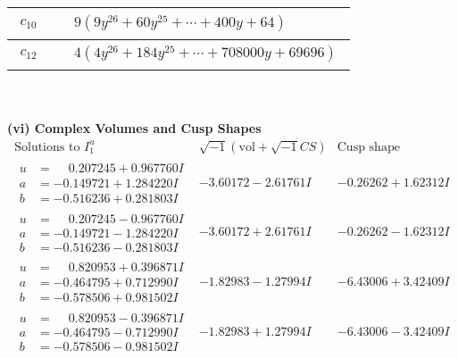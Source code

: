 \documentclass[1p]{elsarticle_modified}
\theoremstyle{definition}
\newcommand{\I}{\sqrt{-1}}
\begin{document}
\begin{tabular}{m{50pt}|m{274pt}}
\hline $$\begin{aligned}c_{10}\end{aligned}$$&$\begin{aligned}
&9(9 y^{26}+60 y^{25}+\cdots+400 y+64)
\end{aligned}$\\
\hline $$\begin{aligned}c_{12}\end{aligned}$$&$\begin{aligned}
&4(4 y^{26}+184 y^{25}+\cdots+708000 y+69696)
\end{aligned}$\\
\hline
\end{tabular}\\~\\
\newpage\flushleft \textbf{(vi) Complex Volumes and Cusp Shapes}
$$\begin{array}{c|c|c}  
\text{Solutions to }I^u_{1}& \I (\text{vol} + \sqrt{-1}CS) & \text{Cusp shape}\\
 \hline 
\begin{aligned}
u &= \phantom{-}0.207245 + 0.967760 I \\
a &= -0.149721 + 1.284220 I \\
b &= -0.516236 + 0.281803 I\end{aligned}
 & -3.60172 - 2.61761 I & -0.26262 + 1.62312 I \\ \hline\begin{aligned}
u &= \phantom{-}0.207245 - 0.967760 I \\
a &= -0.149721 - 1.284220 I \\
b &= -0.516236 - 0.281803 I\end{aligned}
 & -3.60172 + 2.61761 I & -0.26262 - 1.62312 I \\ \hline\begin{aligned}
u &= \phantom{-}0.820953 + 0.396871 I \\
a &= -0.464795 + 0.712990 I \\
b &= -0.578506 + 0.981502 I\end{aligned}
 & -1.82983 - 1.27994 I & -6.43006 + 3.42409 I \\ \hline\begin{aligned}
u &= \phantom{-}0.820953 - 0.396871 I \\
a &= -0.464795 - 0.712990 I \\
b &= -0.578506 - 0.981502 I\end{aligned}
 & -1.82983 + 1.27994 I & -6.43006 - 3.42409 I \\ \hline\begin{aligned}

\end{aligned}
\end{array}$$
\end{document}
